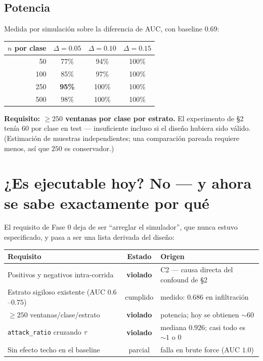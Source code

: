 \documentclass[11pt]{article}
\newcommand{\code}[1]{\texttt{\small #1}}
\begin{document}
\subsection{Potencia}

Medida por simulación sobre la diferencia de AUC, con baseline $0.69$:

\begin{center}
\begin{tabular}{rccc}
\toprule
$n$ por clase & $\Delta = 0.05$ & $\Delta = 0.10$ & $\Delta = 0.15$ \\
\midrule
50   & 77\% & 94\% & 100\% \\
100  & 85\% & 97\% & 100\% \\
\rowcolor{good!10} 250  & \textbf{95\%} & 100\% & 100\% \\
500  & 98\% & 100\% & 100\% \\
\bottomrule
\end{tabular}
\end{center}

\textbf{Requisito: $\ge 250$ ventanas por clase por estrato.} El experimento de \S2 tenía 60 por clase en test --- insuficiente incluso si el diseño hubiera sido válido. (Estimación de muestras independientes; una comparación pareada requiere menos, así que $250$ es conservador.)

\section{¿Es ejecutable hoy? No --- y ahora se sabe exactamente por qué}

El requisito de Fase 0 deja de ser ``arreglar el simulador'', que nunca estuvo especificado, y pasa a ser una lista derivada del diseño:

\begin{center}
\begin{tabular}{lcp{5.6cm}}
\toprule
\textbf{Requisito} & \textbf{Estado} & \textbf{Origen} \\
\midrule
Positivos y negativos intra-corrida & \cellcolor{crit!12}\textbf{violado} & C2 --- causa directa del confound de \S2 \\
Estrato sigiloso existente (AUC $0.6$--$0.75$) & \cellcolor{good!12}cumplido & medido: $0.686$ en infiltración \\
$\ge 250$ ventanas/clase/estrato & \cellcolor{crit!12}\textbf{violado} & potencia; hoy se obtienen $\sim 60$ \\
\code{attack\_ratio} cruzando $\tau$ & \cellcolor{crit!12}\textbf{violado} & mediana $0.926$; casi todo es $\sim 1$ o $0$ \\
Sin efecto techo en el baseline & \cellcolor{warn!12}parcial & falla en brute force (AUC $1.0$) \\
\bottomrule
\end{tabular}
\end{center}
\end{document}
